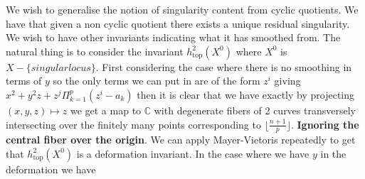 \documentclass[11pt]{report}
\theoremstyle{definition}
\theoremstyle{definition}
\theoremstyle{definition}
\theoremstyle{definition}
\theoremstyle{definition}
\theoremstyle{definition}
\theoremstyle{definition}
\theoremstyle{definition}
\begin{document}
 We wish to generalise the notion of singularity content from cyclic quotients. We have that given a non cyclic quotient there exists a unique residual singularity. We wish to have other invariants indicating what it has smoothed from. The natural thing is to consider the invariant $h^2_{\text{top}}(X^0)$ where $X^0$ is $X-\{singular locus\}$. First considering the case where there is no smoothing in terms of $y$ so the only terms we can put in are of the form $z^i$ giving $x^2 + y^2z +z^j \Pi_{k=1}^{p} (z^i - a_k)$ then it is clear that we have exactly by projecting $(x,y,z) \mapsto z$ we get a map to $\mathbb{C}$ with degenerate fibers of 2 curves transversely intersecting over the finitely many points corresponding to $\lfloor \frac{n+1}{p} \rfloor$. 
 \textbf{Ignoring the central fiber over the origin}. We can apply Mayer-Vietoris repeatedly to get that $h^2_{\text{top}}(X^0)$ is a deformation invariant. In the case where we have $y$ in the deformation we have 
 
\end{document}
